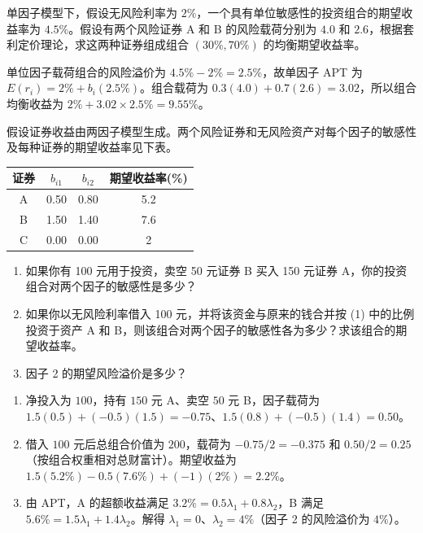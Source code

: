\begin{problem}
 单因子模型下，假设无风险利率为 $2\%$，一个具有单位敏感性的投资组合的期望收益率为 $4.5\%$。假设有两个风险证券 A 和 B 的风险载荷分别为 $4.0$ 和 $2.6$，根据套利定价理论，求这两种证券组成组合 $(30\%,70\%)$ 的均衡期望收益率。
\end{problem}
\begin{solution}
单位因子载荷组合的风险溢价为 $4.5\%-2\%=2.5\%$，故单因子 APT 为 $E(r_i)=2\%+b_i(2.5\%)$。组合载荷为 $0.3(4.0)+0.7(2.6)=3.02$，所以组合均衡收益为 $2\%+3.02\times2.5\%=9.55\%$。
\end{solution}
\begin{problem}
 假设证券收益由两因子模型生成。两个风险证券和无风险资产对每个因子的敏感性及每种证券的期望收益率见下表。
\begin{center}
\begin{tabular}{cccc}
    证券 & $b_{i1}$ & $b_{i2}$ & 期望收益率(\%)\\
    \hline
    A & 0.50 & 0.80 & 5.2\\
    B & 1.50 & 1.40 & 7.6\\
    C & 0.00 & 0.00 & 2\\
\end{tabular}
\end{center}
\begin{enumerate}[label=(\alph*)]
    \item 如果你有 \num{100} 元用于投资，卖空 \num{50} 元证券 B 买入 \num{150} 元证券 A，你的投资组合对两个因子的敏感性是多少？
    \item 如果你以无风险利率借入 \num{100} 元，并将该资金与原来的钱合并按 (1) 中的比例投资于资产 A 和 B，则该组合对两个因子的敏感性各为多少？求该组合的期望收益率。
    \item 因子 2 的期望风险溢价是多少？
\end{enumerate}
\end{problem}
\begin{solution}
\begin{enumerate}[label=(\alph*)]
\item 净投入为 $100$，持有 $150$ 元 A、卖空 $50$ 元 B，因子载荷为 $1.5(0.5)+(-0.5)(1.5)=-0.75$、$1.5(0.8)+(-0.5)(1.4)=0.50$。
\item 借入 $100$ 元后总组合价值为 $200$，载荷为 $-0.75/2=-0.375$ 和 $0.50/2=0.25$（按组合权重相对总财富计）。期望收益为 $1.5(5.2\%)-0.5(7.6\%)+(-1)(2\%)=2.2\%$。
\item 由 APT，A 的超额收益满足 $3.2\%=0.5\lambda_1+0.8\lambda_2$，B 满足 $5.6\%=1.5\lambda_1+1.4\lambda_2$。解得 $\lambda_1=0$、$\lambda_2=4\%$（因子 2 的风险溢价为 $4\%$）。
\end{enumerate}
\end{solution}
